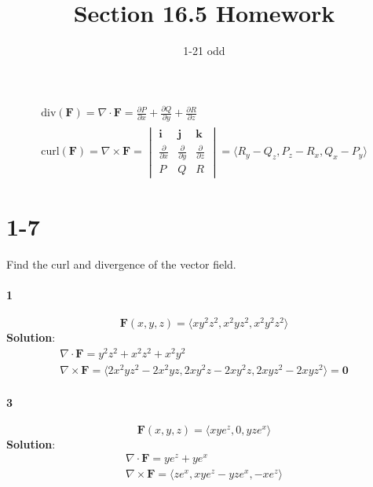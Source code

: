 \documentclass{article}
\title{Section 16.5 Homework}
\author{1-21 odd}
\date{}
\newcommand{\parf}[2]{\frac{\partial #1}{\partial #2}}
\begin{document}
    \maketitle

    \begin{gather*}
        \mathrm{div}(\mathbf{F}) = \nabla \cdot \mathbf{F} = \parf{P}{x} + \parf{Q}{y} + \parf{R}{z}\\
        \mathrm{curl}(\mathbf{F}) = \nabla \times \mathbf{F} =
        \begin{vmatrix}
            \mathbf{i} & \mathbf{j} & \mathbf{k} \\
            \parf{}{x} & \parf{}{y} & \parf{}{z} \\
            P & Q & R
        \end{vmatrix}
        = \langle R_y - Q_z, P_z - R_x, Q_x - P_y \rangle
    \end{gather*}

    \section*{1-7} Find the curl and divergence of the vector field.

    \paragraph{1}
    \[ \mathbf{F}(x,y,z) = \langle xy^{2}z^{2}, x^{2}yz^{2}, x^{2}y^{2}z^{2}  \rangle \]
    \textbf{Solution}:
    \begin{gather*}
        \nabla \cdot \mathbf{F} = y^{2}z^{2} + x^{2}z^{2} + x^{2}y^{2}\\
        \nabla \times \mathbf{F} = \langle 2x^{2}yz^{2} - 2x^{2}yz, 2xy^{2}z - 2xy^{2}z, 2xyz^{2}-2xyz^{2} \rangle = \mathbf{0}
    \end{gather*}

    \paragraph{3}
    \[ \mathbf{F}(x,y,z) = \langle xye^{z}, 0, yze^{x} \rangle \]
    \textbf{Solution}:
    \begin{gather*}
        \nabla \cdot \mathbf{F} = ye^{z}+ye^{x}\\
        \nabla \times \mathbf{F} = \langle ze^{x}, xye^{z}-yze^{x}, -xe^{z} \rangle
    \end{gather*}
    
\end{document}
